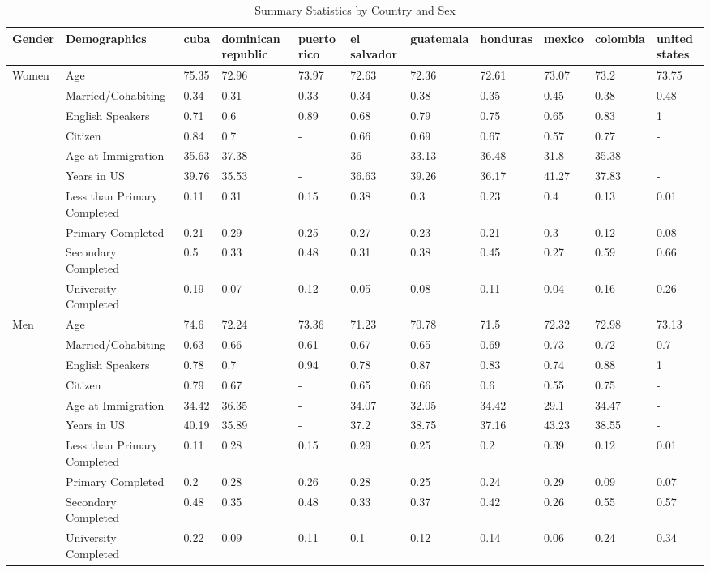 \documentclass[
]{article}
\begin{document}
\begin{landscape}
\begin{table}[ht]
\centering
\caption{Summary Statistics by Country and Sex} 
\label{table2}
\begingroup\small
\begin{tabular}{l|l|lllllllll}
  \hline
Gender & Demographics & cuba & dominican republic & puerto rico & el salvador & guatemala & honduras & mexico & colombia & united states \\ 
  \hline
Women & Age & 75.35 & 72.96 & 73.97 & 72.63 & 72.36 & 72.61 & 73.07 & 73.2 & 73.75 \\ 
   & Married/Cohabiting & 0.34 & 0.31 & 0.33 & 0.34 & 0.38 & 0.35 & 0.45 & 0.38 & 0.48 \\ 
   & English Speakers & 0.71 & 0.6 & 0.89 & 0.68 & 0.79 & 0.75 & 0.65 & 0.83 & 1 \\ 
   & Citizen & 0.84 & 0.7 & - & 0.66 & 0.69 & 0.67 & 0.57 & 0.77 & - \\ 
   & Age at Immigration & 35.63 & 37.38 & - & 36 & 33.13 & 36.48 & 31.8 & 35.38 & - \\ 
   & Years in US & 39.76 & 35.53 & - & 36.63 & 39.26 & 36.17 & 41.27 & 37.83 & - \\ 
   & Less than Primary Completed & 0.11 & 0.31 & 0.15 & 0.38 & 0.3 & 0.23 & 0.4 & 0.13 & 0.01 \\ 
   & Primary Completed & 0.21 & 0.29 & 0.25 & 0.27 & 0.23 & 0.21 & 0.3 & 0.12 & 0.08 \\ 
   & Secondary Completed & 0.5 & 0.33 & 0.48 & 0.31 & 0.38 & 0.45 & 0.27 & 0.59 & 0.66 \\ 
   & University Completed & 0.19 & 0.07 & 0.12 & 0.05 & 0.08 & 0.11 & 0.04 & 0.16 & 0.26 \\ 
  Men & Age & 74.6 & 72.24 & 73.36 & 71.23 & 70.78 & 71.5 & 72.32 & 72.98 & 73.13 \\ 
   & Married/Cohabiting & 0.63 & 0.66 & 0.61 & 0.67 & 0.65 & 0.69 & 0.73 & 0.72 & 0.7 \\ 
   & English Speakers & 0.78 & 0.7 & 0.94 & 0.78 & 0.87 & 0.83 & 0.74 & 0.88 & 1 \\ 
   & Citizen & 0.79 & 0.67 & - & 0.65 & 0.66 & 0.6 & 0.55 & 0.75 & - \\ 
   & Age at Immigration & 34.42 & 36.35 & - & 34.07 & 32.05 & 34.42 & 29.1 & 34.47 & - \\ 
   & Years in US & 40.19 & 35.89 & - & 37.2 & 38.75 & 37.16 & 43.23 & 38.55 & - \\ 
   & Less than Primary Completed & 0.11 & 0.28 & 0.15 & 0.29 & 0.25 & 0.2 & 0.39 & 0.12 & 0.01 \\ 
   & Primary Completed & 0.2 & 0.28 & 0.26 & 0.28 & 0.25 & 0.24 & 0.29 & 0.09 & 0.07 \\ 
   & Secondary Completed & 0.48 & 0.35 & 0.48 & 0.33 & 0.37 & 0.42 & 0.26 & 0.55 & 0.57 \\ 
   & University Completed & 0.22 & 0.09 & 0.11 & 0.1 & 0.12 & 0.14 & 0.06 & 0.24 & 0.34 \\ 
   \hline
\end{tabular}
\endgroup
\end{table}



\end{landscape}
\end{document}
